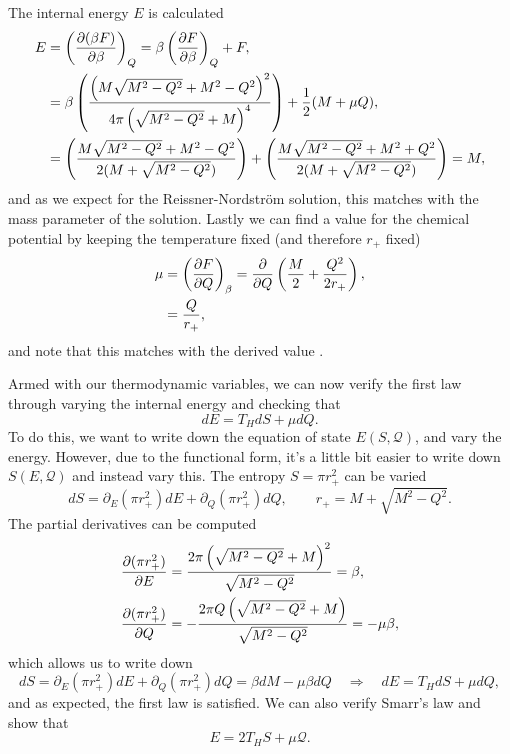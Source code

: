 The internal energy $E$ is calculated
\begin{equation*}
	\begin{aligned}
		E &= \left(\frac{\partial (\beta F)}{\partial \beta} \right)_Q = \beta \left(\frac{\partial  F}{\partial \beta} \right)_Q + F,\\
		&= \beta  \left(\frac{\left(M\sqrt{M^2 - Q^2} + M^2 - Q^2\right)^2}{4\pi \left(\sqrt{M^2 - Q^2} + M\right)^4} \right) + \frac{1}{2} (M + \mu Q), \\
		&= \left(\frac{M\sqrt{M^2 - Q^2} + M^2 - Q^2}{2(M + \sqrt{M^2 - Q^2})} \right) + \left(\frac{M\sqrt{M^2 - Q^2} + M^2 + Q^2}{2(M + \sqrt{M^2 - Q^2})} \right) = M ,
	\end{aligned}
\end{equation*}
and as we expect for the Reissner-Nordstr\"om solution, this matches with the mass parameter of the solution. Lastly we can find a value for the chemical potential by keeping the temperature fixed (and therefore $r_+$ fixed)
\begin{equation*}
	\begin{aligned}
		\mu &=\left(\frac{\partial F}{\partial Q} \right)_\beta = \frac{\partial }{\partial Q} \left(\frac{M}{2} + \frac{Q^2}{2r_+} \right) ,\\
		&= \frac{Q}{r_+},
	\end{aligned}
\end{equation*}
and note that this matches with the derived value .

Armed with our thermodynamic variables, we can now verify the first law  through varying the internal energy and checking that
\begin{equation*}
	dE = T_HdS + \mu dQ.
\end{equation*}
To do this, we want to write down the equation of state $E(S, \mathcal{Q})$, and vary the energy. However, due to the functional form, it's a little bit easier to write down $S(E, \mathcal{Q})$ and instead vary this. The entropy $S = \pi r^2_+$ can be varied
\begin{equation*}
	dS = \partial_E (\pi r_+^2) dE + \partial_Q(\pi r_+^2) dQ, \qquad r_+ = M + \sqrt{M^2 - Q^2}.
\end{equation*}
The partial derivatives can be computed
\begin{equation*}
\begin{aligned}
	\frac{\partial (\pi r_+^2)}{\partial E} &= \frac{2\pi\left(\sqrt{M^2 -Q^2} + M \right)^2}{\sqrt{M^2 -Q^2}} = \beta ,\\
	\frac{\partial (\pi r_+^2)}{\partial Q} &= -\frac{2\pi Q\left(\sqrt{M^2 -Q^2} + M \right)}{\sqrt{M^2 -Q^2}} = -\mu \beta,
\end{aligned}
\end{equation*}
which allows us to write down
\begin{equation*}
	dS = \partial_E(\pi r_+^2) dE + \partial_Q(\pi r_+^2) dQ = \beta dM - \mu \beta dQ \quad \Rightarrow \quad dE = T_H dS + \mu dQ,
\end{equation*}
and as expected, the first law is satisfied. We can also verify Smarr's law \cite{landau2013statistical} and show that
\begin{equation*}
	E = 2T_HS + \mu \mathcal{Q}.
\end{equation*}

